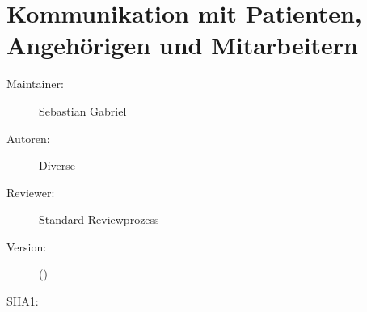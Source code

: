 \def\ChapterCode{KOM}
\chapter
[\CO{[KOM]} Kommunikation mit Patienten, Angehörigen und Mitarbeitern] 
{Kommunikation mit Patienten, Angehörigen und Mitarbeitern}
\label{chp:KOM}

\ChapterIntro
{%

}
{%
\begin{description}
  \item[Maintainer:] Sebastian Gabriel
  \item[Autoren:] Diverse
  \item[Reviewer:] Standard-Reviewprozess
  \item[Version:] {\VarDocVersionTypeName} ({\VarDocVersionTypeDescription})
  \item[SHA1:] {\DocGitCommit}
\end{description}

{\TxTeilkapitelAASS}}

\clearpage

\section{}
\label{topic:kommunikationsregeln}

\bigskip


